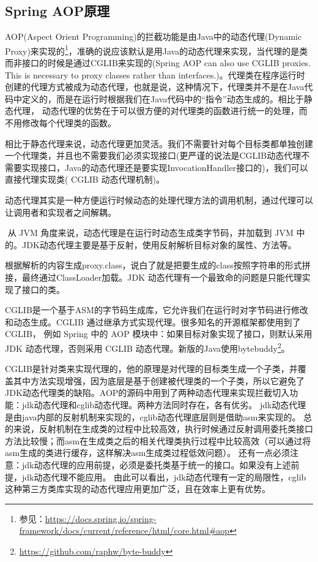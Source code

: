 \documentclass[../../../interview-questions.tex]{subfiles}
\begin{document}
\subsection{Spring AOP原理}

AOP(Aspect Orient Programming)的拦截功能是由Java中的动态代理(Dynamic Proxy)来实现的\footnote{参见：\url{https://docs.spring.io/spring-framework/docs/current/reference/html/core.html\#aop}}，准确的说应该默认是用Java的动态代理来实现，当代理的是类而非接口的时候是通过CGLIB来实现的(Spring AOP can also use CGLIB proxies. This is necessary to proxy classes rather than interfaces.)。代理类在程序运行时创建的代理方式被成为动态代理，也就是说，这种情况下，代理类并不是在Java代码中定义的，而是在运行时根据我们在Java代码中的“指令”动态生成的。相比于静态代理， 动态代理的优势在于可以很方便的对代理类的函数进行统一的处理，而不用修改每个代理类的函数。

​ 相比于静态代理来说，动态代理更加灵活。我们不需要针对每个目标类都单独创建一个代理类，并且也不需要我们必须实现接口(更严谨的说法是CGLIB动态代理不需要实现接口，Java的动态代理还是要实现InvocationHandler接口的)，我们可以直接代理实现类( CGLIB 动态代理机制)。

​ 动态代理其实是一种方便运行时候动态的处理代理方法的调用机制，通过代理可以让调用者和实现者之间解耦。

​ 从 JVM 角度来说，动态代理是在运行时动态生成类字节码，并加载到 JVM 中的。JDK动态代理主要是基于反射，使用反射解析目标对象的属性、方法等。

根据解析的内容生成proxy.class，说白了就是把要生成的class按照字符串的形式拼接，最终通过ClassLoader加载。JDK 动态代理有一个最致命的问题是只能代理实现了接口的类。

​ CGLIB是一个基于ASM的字节码生成库，它允许我们在运行时对字节码进行修改和动态生成。CGLIB 通过继承方式实现代理。很多知名的开源框架都使用到了CGLIB， 例如 Spring 中的 AOP 模块中：如果目标对象实现了接口，则默认采用 JDK 动态代理，否则采用 CGLIB 动态代理。新版的Java使用bytebuddy\footnote{\url{https://github.com/raphw/byte-buddy}}。

​ CGLIB是针对类来实现代理的，他的原理是对代理的目标类生成一个子类，并覆盖其中方法实现增强，因为底层是基于创建被代理类的一个子类，所以它避免了JDK动态代理类的缺陷。AOP的源码中用到了两种动态代理来实现拦截切入功能：jdk动态代理和cglib动态代理。两种方法同时存在，各有优劣。 jdk动态代理是由java内部的反射机制来实现的，cglib动态代理底层则是借助asm来实现的。 总的来说，反射机制在生成类的过程中比较高效，执行时候通过反射调用委托类接口方法比较慢；而asm在生成类之后的相关代理类执行过程中比较高效（可以通过将asm生成的类进行缓存，这样解决asm生成类过程低效问题）。 还有一点必须注意：jdk动态代理的应用前提，必须是委托类基于统一的接口。如果没有上述前提，jdk动态代理不能应用。 由此可以看出，jdk动态代理有一定的局限性，cglib这种第三方类库实现的动态代理应用更加广泛，且在效率上更有优势。
\end{document}
